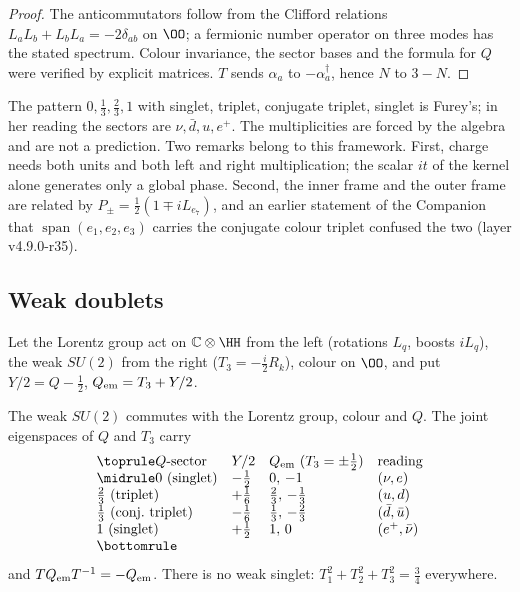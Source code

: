 \begin{proof}
The anticommutators follow from the Clifford relations \(L_aL_b+L_bL_a=-2\delta_{ab}\) on \(\OO\); a fermionic number operator on three
modes has the stated spectrum.  Colour invariance, the sector bases and the formula for \(Q\) were verified by explicit matrices.
\(T\) sends \(\alpha_a\) to \(-\alpha_a^\dagger\), hence \(N\) to \(3-N\).
\end{proof}

The pattern \(0,\tfrac13,\tfrac23,1\) with singlet, triplet, conjugate triplet, singlet is Furey's; in her reading the sectors are
\(\nu,\bar d,u,e^+\).  The multiplicities are forced by the algebra and are not a prediction.  Two remarks belong to this framework.
First, charge needs both units and both left and right multiplication; the scalar \(it\) of the kernel alone generates only a global
phase.  Second, the inner frame and the outer frame are related by \(P_\pm=\tfrac12(1\mp iL_{e_7})\), and an earlier statement of the
Companion that \(\operatorname{span}(e_1,e_2,e_3)\) carries the conjugate colour triplet confused the two (layer v4.9.0-r35).

\subsection{Weak doublets}

Let the Lorentz group act on \(\mathbb C\otimes\HH\) from the left (rotations \(L_q\), boosts \(iL_q\)), the weak \(SU(2)\) from the right
(\(T_3=-\tfrac i2R_k\)), colour on \(\OO\), and put \(Y/2=Q-\tfrac12\), \(Q_{\rm em}=T_3+Y/2\).

\begin{proposition}[Doublets]\label{prop:doublets}
The weak \(SU(2)\) commutes with the Lorentz group, colour and \(Q\).  The joint eigenspaces of \(Q\) and \(T_3\) carry
\[
\begin{array}{llll}
\toprule
Q\text{-sector} & Y/2 & Q_{\rm em}\ (T_3=\pm\tfrac12) & \text{reading}\\
\midrule
0\ (\text{singlet}) & -\tfrac12 & 0,\,-1 & (\nu,e)\\
\tfrac23\ (\text{triplet}) & +\tfrac16 & \tfrac23,\,-\tfrac13 & (u,d)\\
\tfrac13\ (\text{conj.\ triplet}) & -\tfrac16 & \tfrac13,\,-\tfrac23 & (\bar d,\bar u)\\
1\ (\text{singlet}) & +\tfrac12 & 1,\,0 & (e^+,\bar\nu)\\
\bottomrule
\end{array}
\]
and \(TQ_{\rm em}T^{-1}=-Q_{\rm em}\).  There is no weak singlet: \(T_1^2+T_2^2+T_3^2=\tfrac34\) everywhere.
\end{proposition}

